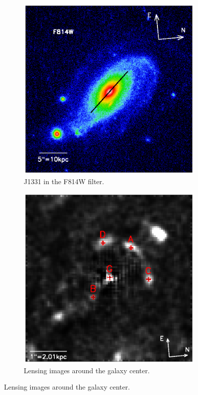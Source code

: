\documentclass[useAMS,usenatbib]{mnras}
\begin{document}
\begin{figure}
\begin{subfigure}{.5\textwidth}
  \includegraphics[width=.9\linewidth]{fig/first_glimpse_814.ps}
  \caption{J1331 in the F814W filter.}
  \label{fig:F814W}
\end{subfigure}
\begin{subfigure}{.5\textwidth}
  \centering
  \includegraphics[width=.9\linewidth]{fig/lens_imgpos.ps}
  \caption{Lensing images around the galaxy center.}
  \label{fig:lens_just_imgpos}

\end{subfigure}
\end{figure}
\end{document}
